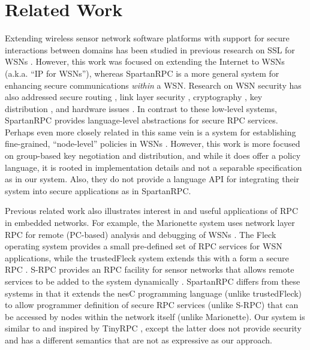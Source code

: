 \section{Related Work}
\label{section-related-work}

Extending wireless sensor network software platforms with support for
secure interactions between domains has been studied in previous
research on SSL for WSNs \cite{10.1109/WAINA.2009.47}. However, this
work was focused on extending the Internet to WSNs (a.k.a. ``IP for
WSNs''), whereas SpartanRPC is a more general system for enhancing
secure communications \emph{within} a WSN.  Research on WSN security
has also addressed secure routing \cite{senroute-ahnj03}, link layer
security \cite{karlog-tinysec-2004}, cryptography \cite{bertoni-2006},
key distribution \cite{camtepe-bulent-05}, and hardware issues
\cite{perrig-2004}. In contrast to these low-level systems, SpartanRPC
provides language-level abstractions for secure RPC services.  Perhaps
even more closely related in this same vein is a system for
establishing fine-grained, ``node-level'' policies in WSNs
\cite{Claycomb:2011:NNL:1889383.1889450}. However, this work is more
focused on group-based key negotiation and distribution, and while it
does offer a policy language, it is rooted in implementation details
and not a separable specification as in our system. Also, they do not
provide a language API for integrating their system into secure
applications as in SpartanRPC.

Previous related work also illustrates interest in and useful
applications of RPC in embedded networks. For example, the Marionette
system uses network layer RPC for remote (PC-based) analysis and
debugging of WSNs \cite{whitehouse-marionette-2006}. The Fleck operating
system provides a small pre-defined set of RPC services for WSN
applications, while the trustedFleck system extends this with a form a
secure RPC \cite{hu-secfleck-2009,Hu:2010:TTW:1806895.1806900}. S-RPC
provides an RPC facility for sensor networks that allows remote services
to be added to the system dynamically \cite{5766863}. SpartanRPC differs
from these systems in that it extends the nesC programming language
(unlike trustedFleck) to allow programmer definition of secure RPC
services (unlike S-RPC) that can be accessed by nodes within the network
itself (unlike Marionette). Our system is similar to and inspired by
TinyRPC \cite{may-tinyrpc-2007}, except the latter does not provide
security and has a different semantics that are not as expressive as our
approach.


